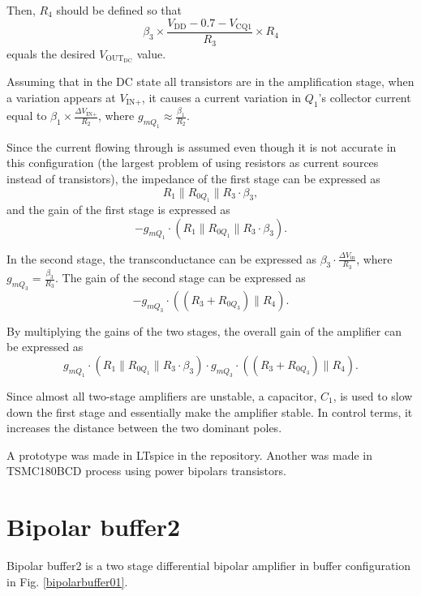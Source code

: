 \documentclass[12pt]{article}
\begin{document}
Then, $R_4$ should be defined so that  
\[
\beta_3 \times \frac{V_{\text{DD}} - 0.7 - V_{\text{CQ1}}}{R_3} \times R_4
\]  
equals the desired $V_{\text{OUT}_{\text{DC}}}$ value.  


Assuming that in the DC state all transistors are in the amplification stage, when a variation appears at $V_{\text{IN+}}$, it causes a current variation in $Q_1$'s collector current equal to $\beta_1 \times \frac{\Delta V_{\text{IN+}}}{R_2}$, where $g_{mQ_1} \approx \frac{\beta_1}{R_2}$.  

Since the current flowing through is assumed even though it is not accurate in this configuration (the largest problem of using resistors as current sources instead of transistors), the impedance of the first stage can be expressed as  
\[
R_1 \parallel R_{0Q_1} \parallel R_3 \cdot \beta_3,
\]  
and the gain of the first stage is expressed as  
\[
-g_{mQ_1} \cdot \left( R_1 \parallel R_{0Q_1} \parallel R_3 \cdot \beta_3 \right).
\]  

In the second stage, the transconductance can be expressed as $\beta_3 \cdot \frac{\Delta V_{\text{in}}}{R_3}$, where $g_{mQ_3} = \frac{\beta_3}{R_3}$. The gain of the second stage can be expressed as  
\[
-g_{mQ_3} \cdot \left( (R_3 + R_{0Q_3}) \parallel R_4 \right).
\]  

By multiplying the gains of the two stages, the overall gain of the amplifier can be expressed as  
\[
g_{mQ_1} \cdot \left( R_1 \parallel R_{0Q_1} \parallel R_3 \cdot \beta_3 \right) \cdot g_{mQ_3} \cdot \left( (R_3 + R_{0Q_3}) \parallel R_4 \right).
\]  

Since almost all two-stage amplifiers are unstable, a capacitor, $C_1$, is used to slow down the first stage and essentially make the amplifier stable. In control terms, it increases the distance between the two dominant poles.


A prototype was made in LTspice in the repository. Another was made in TSMC180BCD process using power bipolars transistors.






\newpage

\section{Bipolar buffer2}



Bipolar buffer2 is a two stage differential bipolar amplifier in buffer configuration in Fig. \ref{bipolarbuffer01}. 
\end{document}
